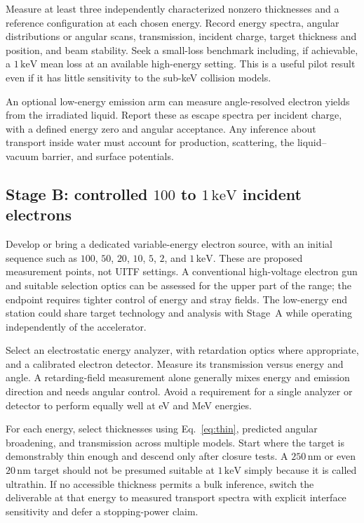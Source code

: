 \documentclass[11pt,letterpaper]{article}
\newcommand{\keV}{\,\mathrm{keV}}
\newcommand{\nm}{\,\mathrm{nm}}
\begin{document}
Measure at least three independently characterized nonzero thicknesses and a reference configuration
at each chosen energy. Record energy spectra, angular distributions or angular scans, transmission,
incident charge, target thickness and position, and beam stability. Seek a small-loss benchmark
including, if achievable, a $1\keV$ mean loss at an available high-energy setting. This is a useful
pilot result even if it has little sensitivity to the sub-keV collision models.

An optional low-energy emission arm can measure angle-resolved electron yields from the irradiated
liquid. Report these as escape spectra per incident charge, with a defined energy zero and angular
acceptance. Any inference about transport inside water must account for production, scattering,
the liquid--vacuum barrier, and surface potentials.

\subsection{\texorpdfstring{Stage B: controlled $100$ to $1\keV$ incident electrons}
  {Stage B: controlled 100 to 1 keV incident electrons}}

Develop or bring a dedicated variable-energy electron source, with an initial sequence such as
$100$, $50$, $20$, $10$, $5$, $2$, and $1\keV$. These are proposed measurement points, not
UITF settings. A conventional high-voltage electron gun and suitable selection optics can be
assessed for the upper part of the range; the endpoint requires tighter control of energy and stray
fields. The low-energy end station could share target technology and analysis with Stage~A while
operating independently of the accelerator.

Select an electrostatic energy analyzer, with retardation optics where appropriate, and a calibrated
electron detector. Measure its transmission versus energy and angle. A retarding-field measurement
alone generally mixes energy and emission direction and needs angular control. Avoid a requirement
for a single analyzer or detector to perform equally well at eV and MeV energies.

For each energy, select thicknesses using Eq.~\ref{eq:thin}, predicted angular broadening, and
transmission across multiple models. Start where the target is demonstrably thin enough and descend
only after closure tests. A $250\nm$ or even $20\nm$ target should not be presumed suitable at
$1\keV$ simply because it is called ultrathin. If no accessible thickness permits a bulk inference,
switch the deliverable at that energy to measured transport spectra with explicit interface
sensitivity and defer a stopping-power claim.
\end{document}
